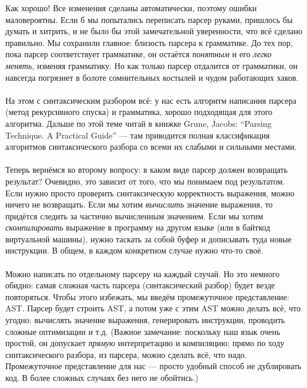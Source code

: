 \documentclass[11pt]{book}
\begin{document}

Как хорошо! Все изменения сделаны автоматически, поэтому ошибки маловероятны.
Если б мы попытались переписать парсер руками, пришлось бы думать и хитрить, и
не было бы этой замечательной уверенности, что всё сделано правильно.
Мы сохранили главное: близость парсера к грамматике. До тех пор, пока парсер
соответствует грамматике, он остаётся \emph{понятным} и его \emph{легко менять},
изменяя  грамматику. Но как только парсер отдалится от грамматики,
он навсегда погрязнет в болоте сомнительных костылей и чудом работающих хаков.
\\ \\
На этом с синтаксическим разбором всё: у нас есть алгоритм написания парсера (метод рекурсивного спуска)
и грамматика, хорошо подходящая для этого алгоритма. Дальше по этой теме читай в книжке Grune, Jacobs: ``Parsing Technique. A Practical Guide'' --- там
приводится полная классификация алгоритмов синтаксического разбора со всеми их слабыми и сильными местами.
\\ \\
Теперь вернёмся ко второму вопросу: в каком виде парсер должен возвращать результат?
Очевидно, это зависит от того, что мы понимаем под результатом. Если нужно просто
проверить синтаксическую корректность выражения, можно ничего не возвращать.
Если мы хотим \emph{вычислить} значение выражения, то придётся следить
за частично вычисленным значением. Если мы хотим \emph{скомпилировать} выражение
в программу на другом языке (или в байткод виртуальной машины), нужно таскать за собой
буфер и дописывать туда новые инструкции. В общем, в каждом конкретном случае
нужно что-то своё.
\\ \\
Можно написать по отдельному парсеру на каждый случай. Но это немного обидно:
самая сложная часть парсера (синтаксический разбор) будет везде повторяться.
Чтобы этого избежать, мы введём промежуточное представление: AST. Парсер будет
строить AST, а потом уже с этим AST можно делать всё, что угодно:
вычислять значение выражения, генерировать инструкции, проводить сложные оптимизации и т.д.
(Важное замечание: поскольку наш язык очень простой, он допускает \emph{прямую} интерпретацию
и компиляцию: прямо по ходу синтаксического разбора, из парсера, можно сделать
всё, что надо. Промежуточное представление для нас --- просто удобный способ не дублировать код.
В более сложных случаях без него не обойтись.)
\\ \\
\end{document}
